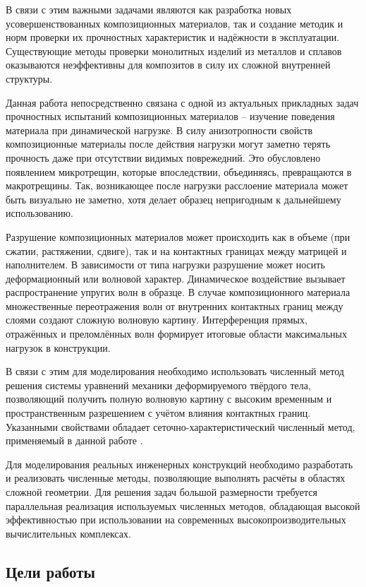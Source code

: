 В связи с этим важными задачами являются как разработка новых усовершенствованных 
композиционных материалов, так и создание методик и норм проверки их прочностных характеристик 
и надёжности в эксплуатации. Существующие методы проверки монолитных изделий из металлов и сплавов оказываются неэффективны для композитов в силу их сложной внутренней структуры.

Данная работа непосредственно связана с одной из актуальных прикладных задач 
прочностных испытаний композиционных материалов -- изучение поведения материала при 
динамической нагрузке. В силу анизотропности свойств композиционные материалы после
действия нагрузки могут заметно терять прочность даже при отсутствии видимых поврежедний.
Это обусловлено появлением микротрещин, которые впоследствии, объединяясь,
превращаются в макротрещины. Так, возникающее после нагрузки расслоение
материала может быть визуально не заметно, хотя делает образец непригодным к
дальнейшему использованию.

Разрушение композиционных материалов может происходить как в объеме (при сжатии, растяжении, 
сдвиге), так и на контактных границах между матрицей и наполнителем. В зависимости от типа 
нагрузки разрушение может носить деформационный или волновой характер. 
Динамическое воздействие вызывает распространение упругих волн в образце. В случае 
композиционного материала множественные переотражения волн от внутренних контактных 
границ между слоями создают сложную волновую картину. Интерференция прямых, отражённых 
и преломлённых волн формирует итоговые области максимальных нагрузок в конструкции.

В связи с этим для моделирования необходимо использовать численный метод решения системы 
уравнений механики деформируемого твёрдого тела, позволяющий получить полную волновую 
картину с высоким временным и пространственным разрешением с учётом влияния контактных 
границ. Указанными свойствами обладает сеточно-характеристический численный метод, 
применяемый в данной работе \cite{petrov_tormasov_holodov, petrov, magomedov}.

Для моделирования реальных инженерных конструкций необходимо разработать и реализовать численные методы, позволяющие выполнять расчёты в областях сложной геометрии. Для решения задач большой размерности требуется параллельная реализация используемых численных методов, обладающая высокой эффективностью при использовании на современных высокопроизводительных вычислительных комплексах.

\subsection*{Цели работы}

